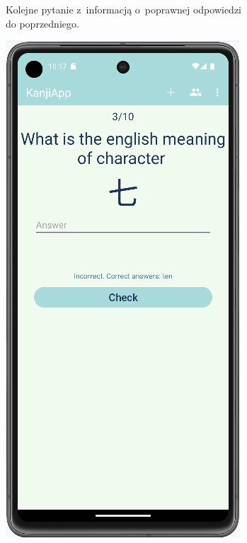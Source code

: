 \documentclass[a4paper,twoside,12pt]{book}
\begin{document}
\begin{figure}
\begin{subfigure}{0.3\textwidth}
   \caption{Kolejne pytanie z~informacją o~poprawnej odpowiedzi do poprzedniego.}
   \label{fig:correct}
\end{subfigure}
\hfill 
\begin{subfigure}{0.3\textwidth}
   \includegraphics[width=\textwidth]{learn/incorrect}

\end{subfigure}
\end{figure}
\end{document}

